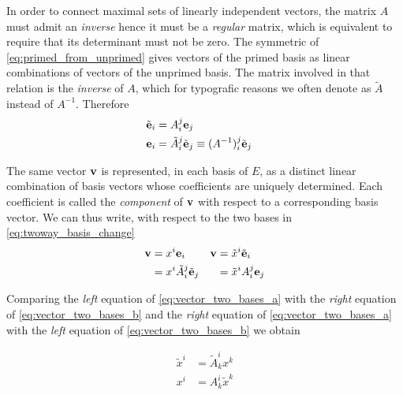 In order to connect maximal sets of linearly independent vectors, the matrix $A$ must admit an \textit{inverse} hence it must be a \textit{regular} matrix, which is equivalent to require that its determinant must not be zero. The symmetric of \ref{eq:primed_from_unprimed} gives vectors of the primed basis as linear combinations of vectors of the unprimed basis. The matrix involved in that relation is the \textit{inverse} of $A$, which for typografic reasons we often denote as $\tilde{A}$ instead of $A^{-1}$. Therefore
\begin{subequations}
\label{eq:twoway_basis_change}
\begin{align}
\label{eq:twoway_basis_change_a}
\tilde{\vb{e}}_i &= A_i^j  \vb{e}_j  & \\
\label{eq:twoway_basis_change_b}
\vb{e}_i         &= \tilde{A}_i^j \tilde{\vb{e}}_j \equiv ({A^{-1}})_i^j \tilde{\vb{e}}_j 
\end{align}
\end{subequations}

The same vector $\vb{v}$ is represented, in each basis of $E$, as a distinct linear combination of basis vectors whose coefficients are uniquely determined. Each coefficient is called the \textit{component} of $\vb{v}$ with respect to a corresponding basis vector. We can thus write, with respect to the two bases in \ref{eq:twoway_basis_change}
\begin{subequations}
\label{eq:vector_two_bases}
\begin{align}
\label{eq:vector_two_bases_a}
\vb{v} &= x^i \vb{e}_i			                &	\vb{v} &= \tilde{x}^i \tilde{\vb{e}}_i \\	 
\label{eq:vector_two_bases_b}
      &= x^i \tilde{A}_i^j \tilde{\vb{e}}_j     &          &= \tilde{x}^i A_i^j  \vb{e}_j 
\end{align}
\end{subequations}

Comparing the \textit{left} equation of \ref{eq:vector_two_bases_a} with the \textit{right} equation of \ref{eq:vector_two_bases_b} and the \textit{right} equation of \ref{eq:vector_two_bases_a} with the \textit{left} equation of \ref{eq:vector_two_bases_b} we obtain

\begin{subequations}
\label{eq:twoway_coord_change}
\begin{align}
\label{eq:twoway_coord_change_a}
\tilde{x}^i &= \tilde{A}^i_k  x^k \\
\label{eq:twoway_coord_change_b}
x^i &= A^i_k \tilde{x}^k 
\end{align}
\end{subequations}

